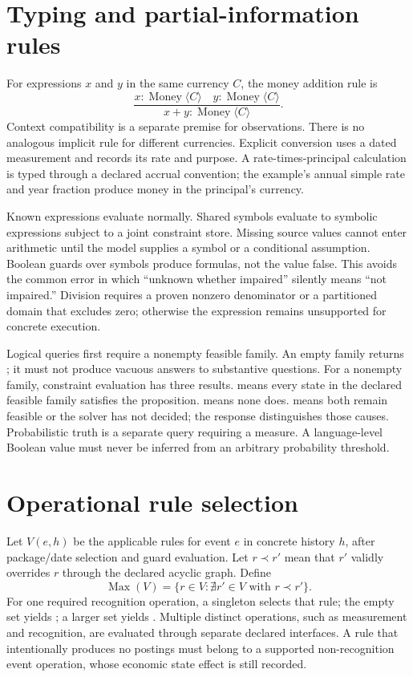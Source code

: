 \section{Typing and partial-information rules}

For expressions $x$ and $y$ in the same currency $C$, the money addition rule is
\[
 \frac{x:\operatorname{Money}\langle C\rangle\quad
       y:\operatorname{Money}\langle C\rangle}
      {x+y:\operatorname{Money}\langle C\rangle}.
\]
Context compatibility is a separate premise for observations. There is no
analogous implicit rule for different currencies. Explicit conversion uses
a dated measurement and records its rate and purpose. A rate-times-principal
calculation is typed through a declared accrual convention; the example's
annual simple rate and year fraction produce money in the principal's currency.

Known expressions evaluate normally. Shared symbols evaluate to symbolic
expressions subject to a joint constraint store. Missing source values cannot
enter arithmetic until the model supplies a symbol or a conditional assumption.
Boolean guards over symbols produce formulas, not the value false. This avoids
the common error in which ``unknown whether impaired'' silently means
``not impaired.'' Division requires a proven nonzero denominator or a
partitioned domain that excludes zero; otherwise the expression remains
unsupported for concrete execution.

Logical queries first require a nonempty feasible family. An empty family
returns ; it must not produce vacuous answers to substantive
questions. For a nonempty family, constraint evaluation has three results.
 means every state in
the declared feasible family satisfies the proposition.  means
none does.  means both remain feasible or the solver has
not decided; the response distinguishes those causes. Probabilistic truth is
a separate query requiring a measure. A language-level Boolean value must
never be inferred from an arbitrary probability threshold.

\section{Operational rule selection}

Let $V(e,h)$ be the applicable rules for event $e$ in concrete history $h$,
after package/date selection and guard evaluation. Let $r\prec r'$ mean that
$r'$ validly overrides $r$ through the declared acyclic graph. Define
\[
 \operatorname{Max}(V)=\{r\in V:\nexists r'\in V\text{ with }r\prec r'\}.
\]
For one required recognition operation, a singleton selects that rule; the
empty set yields ; a larger set yields
. Multiple distinct operations, such as measurement and
recognition, are evaluated through separate declared interfaces. A rule that
intentionally produces no postings must belong to a supported non-recognition
event operation, whose economic state effect is still recorded.

